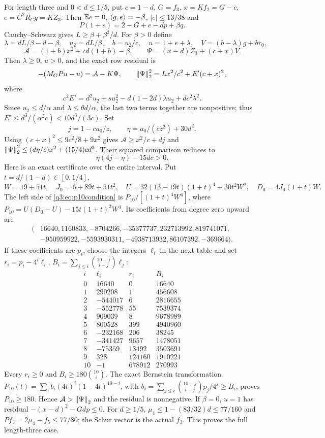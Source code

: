 For length three and $0<d\le1/5$, put $c=1-d$, $G=f_3$, $x=Kf_2=G-c$,
$e=C^2R_Cg=KZ_3$. Then $\mathbb E e=0$, $\left\langle g,e\right\rangle=-\beta$, $|e|\le13/38$ and
\[
 P(1+e)=2-G+e-dp+\beta q.
\]
Cauchy--Schwarz gives $L\ge\beta+\beta^2/d$. For $\beta>0$ define
\[
 \lambda=dL/\beta-d-\beta,\quad u_2=dL/\beta,\quad b=u_2/c,\quad
 u=1+e+\lambda,\quad V=(b-\lambda)g+b{r_0},
\]
\[
 \mathcal A=(1+b)x^2+cd(1+b)-\beta,\qquad
 \Psi=(x-d)Z_3+(c+x)V.
\]
Then $\lambda\ge0$, $u>0$, and the exact row residual is
\[
 -(M_GP u-u)=\mathcal A-K\Psi,\qquad
 \left\lVert\Psi\right\rVert_2^2=Lx^2/c^2+E'(c+x)^2,
\]
where
\[
 c^2E'=d^2u_2+su_2^2-d(1-2d)\lambda u_2+dc^2\lambda^2.
\]
Since $u_2\le d/\alpha$ and $\lambda\le\theta d/\alpha$, the last two terms together are nonpositive; thus $E'\le d^3/(\alpha^2c)<10d^3/(3c)$. Set
\[
 j=1-ca_0/z,\qquad \eta=a_0/(cz^2)+30d^2.
\]
Using $(c+x)^2\le9c^2/8+9x^2$ gives
$\mathcal A\ge x^2/c+dj$ and
$\left\lVert\Psi\right\rVert_2^2\le(d\eta/c)x^2+(15/4)cd^3$.
Their squared comparison reduces to
\begin{equation}\label{q3:eq:p10condition}
 \eta(4j-\eta)-15dc>0.
\end{equation}
Here is an exact certificate over the entire interval. Put $t=d/(1-d)\in[0,1/4]$,
\[
 W=19+51t,\quad J_0=6+89t+51t^2,\quad
 U=32(13-19t)(1+t)^4+30t^2W^2,\quad D_0=4J_0(1+t)W.
\]
The left side of \eqref{q3:eq:p10condition} is $P_{10}/[(1+t)^4W^4]$, where
$P_{10}=U(D_0-U)-15t(1+t)^2W^4$. Its coefficients from degree zero upward are
\[
\begin{split}
(&16640,1160833,-8704266,-35377737,232713992,819741071,\\
 &-950959922,-5593930311,-4938713932,86107392,-369664).
\end{split}
\]
If these coefficients are $p_i$, choose the integers $\ell_i$ in the next table and set
$r_i=p_i-4^i\ell_i$,
$B_i=\sum_{j\le i}\binom{10-j}{i-j}\ell_j$:
\[
\begin{array}{r|r|r|r}
i&\ell_i&r_i&B_i\\\hline
0&16640&0&16640\\1&290208&1&456608\\2&-544017&6&2816655\\
3&-552778&55&7539374\\4&909039&8&9678989\\5&800528&399&4940960\\
6&-232168&206&38245\\7&-341427&9657&1478051\\8&-75359&13492&3503691\\
9&328&124160&1910221\\10&-1&678912&270993
\end{array}
\]
Every $r_i\ge0$ and $B_i\ge180\binom{10}{i}$. The exact Bernstein transformation
$P_{10}(t)=\sum_i b_i(4t)^i(1-4t)^{10-i}$, with
$b_i=\sum_{j\le i}\binom{10-j}{i-j}p_j/4^j\ge B_i$, proves $P_{10}\ge180$. Hence $\mathcal A>\left\lVert\Psi\right\rVert_2$ and the residual is nonnegative. If $\beta=0$, $u=1$ has residual $-(x-d)^2-Gdp\le0$. For $d\ge1/5$, $\mu_4\le1-(83/32)d\le77/160$ and
$Pf_3=2\mu_4-f_5\le77/80$; the Schur vector is the actual $f_3$. This proves the full length-three case.


